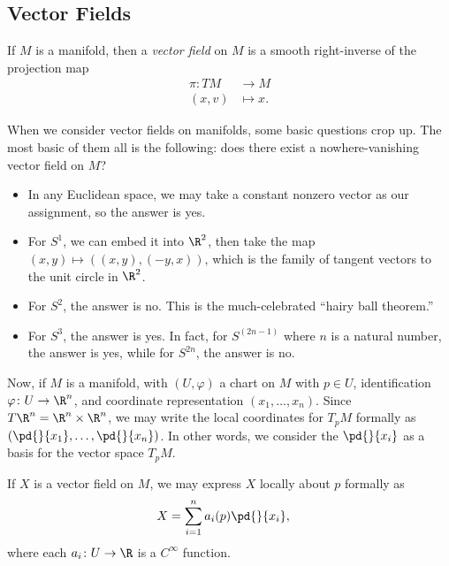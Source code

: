 \documentclass[10pt]{mypackage}
\begin{document}
\subsection{Vector Fields}%
\begin{definition}
  If $M$ is a manifold, then a \textit{vector field} on $M$ is a smooth right-inverse of the projection map
  \begin{align*}
    \pi\colon TM&\rightarrow M\\
    \left( x,v \right) &\mapsto x.
  \end{align*}
\end{definition}
When we consider vector fields on manifolds, some basic questions crop up. The most basic of them all is the following: does there exist a nowhere-vanishing vector field on $M$?
\begin{itemize}
  \item In any Euclidean space, we may take a constant nonzero vector as our assignment, so the answer is yes.
  \item For $S^{1}$, we can embed it into $\R^{2}$, then take the map $\left( x,y \right) \mapsto \left( \left( x,y \right),\left( -y,x \right) \right)$, which is the family of tangent vectors to the unit circle in $\R^{2}$.
  \item For $S^{2}$, the answer is no. This is the much-celebrated ``hairy ball theorem.''
  \item For $S^{3}$, the answer is yes. In fact, for $S^{(2n-1)}$ where $n$ is a natural number, the answer is yes, while for $S^{2n}$, the answer is no.
\end{itemize}
Now, if $M$ is a manifold, with $\left( U,\varphi \right)$ a chart on $M$ with $p\in U$, identification $\varphi\colon U\rightarrow \R^{n}$, and coordinate representation $\left( x_1,\dots,x_n \right)$. Since $T\R^{n} = \R^{n}\times \R^{n}$, we may write the local coordinates for $T_pM$ formally as $ \left( \pd{}{x_1},\dots, \pd{}{x_n} \right) $. In other words, we consider the $\pd{}{x_i}$ as a basis for the vector space $T_pM$.\newline

If $X$ is a vector field on $M$, we may express $X$ locally about $p$ formally as
\begin{align*}
  X &= \sum_{i=1}^{n} a_i(p) \pd{}{x_i},
\end{align*}
where each $a_i\colon U\rightarrow \R$ is a $C^{\infty}$ function.\newline
\end{document}
